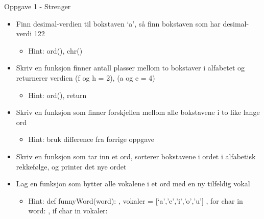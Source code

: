 \documentclass[screen, aspectratio=169]{beamer}
\begin{document}
\begin{frame}{Oppgave 1 - Strenger}
	\begin{itemize}
		\item<+-> Finn desimal-verdien til bokstaven ‘a’, så finn bokstaven som har desimal-verdi 122
		\begin{itemize}
		    \item Hint: ord(), chr()
		\end{itemize}
		\item<+-> Skriv en funksjon finner antall plasser mellom to bokstaver i alfabetet og returnerer verdien (f og h = 2), (a og e = 4)
        	\begin{itemize}
		    \item Hint: ord(), return
		\end{itemize}
		\item<+-> Skriv en funksjon som finner forskjellen mellom alle bokstavene i to like lange ord
        	\begin{itemize}
		    \item Hint: bruk difference fra forrige oppgave
		\end{itemize}
		\item<+-> Skriv en funksjon som tar inn et ord, sorterer bokstavene i ordet i alfabetisk rekkefølge, og printer det nye ordet

		\item<+-> Lag en funksjon som bytter alle vokalene i et ord med en ny tilfeldig vokal
			\begin{itemize}
		    \item Hint: 	def funnyWord(word): , vokaler = [‘a’,’e’,’i’,’o’,’u’] ,
	for char in word: , if char in vokaler:

		\end{itemize}

	\end{itemize}
\end{frame}
\end{document}
